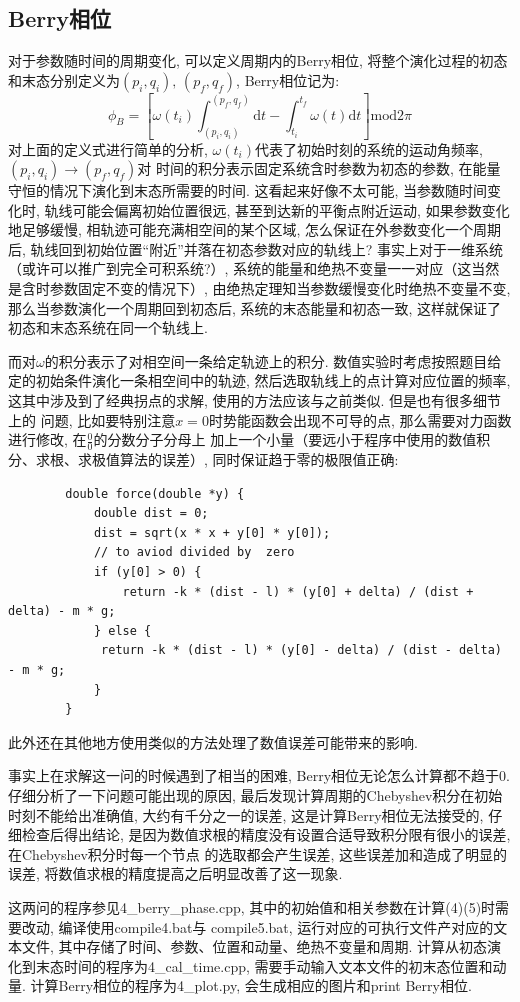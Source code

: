 \documentclass[a4paper,zihao=5,UTF8]{ctexart}
\def\d{\mathrm{d}}
\begin{document}
    \subsection{Berry相位}
    对于参数随时间的周期变化, 可以定义周期内的Berry相位, 将整个演化过程的初态和末态分别定义为$(p_i, q_i),\,(p_f,q_f)$,
    Berry相位记为:
    \begin{equation}
        \phi_B = \left[\omega(t_i)\int_{(p_i, q_i)}^{(p_f,q_f)}\d t - \int_{t_i}^{t_f}\omega(t)\d t\right] \text{mod}2\pi
    \end{equation}
    对上面的定义式进行简单的分析, $\omega(t_i)$代表了初始时刻的系统的运动角频率, $(p_i, q_i)\to(p_f, q_f)$对
    时间的积分表示固定系统含时参数为初态的参数, 在能量守恒的情况下演化到末态所需要的时间. 
    这看起来好像不太可能, 当参数随时间变化时, 轨线可能会偏离初始位置很远, 甚至到达新的平衡点附近运动,
    如果参数变化地足够缓慢, 相轨迹可能充满相空间的某个区域, 怎么保证在外参数变化一个周期后, 
    轨线回到初始位置“附近”并落在初态参数对应的轨线上? 事实上对于一维系统（或许可以推广到完全可积系统?）, 
    系统的能量和绝热不变量一一对应（这当然是含时参数固定不变的情况下）, 由绝热定理知当参数缓慢变化时绝热不变量不变, 
    那么当参数演化一个周期回到初态后, 系统的末态能量和初态一致, 这样就保证了初态和末态系统在同一个轨线上.
    \par
    而对$\omega$的积分表示了对相空间一条给定轨迹上的积分. 数值实验时考虑按照题目给定的初始条件演化一条相空间中的轨迹, 
    然后选取轨线上的点计算对应位置的频率, 这其中涉及到了经典拐点的求解, 使用的方法应该与之前类似. 但是也有很多细节上的
    问题, 比如要特别注意$x=0$时势能函数会出现不可导的点, 那么需要对力函数进行修改, 在$\frac{0}{0}$的分数分子分母上
    加上一个小量（要远小于程序中使用的数值积分、求根、求极值算法的误差）, 同时保证趋于零的极限值正确:
    \begin{lstlisting}
        double force(double *y) {
            double dist = 0;
            dist = sqrt(x * x + y[0] * y[0]);
            // to aviod divided by  zero
            if (y[0] > 0) {
                return -k * (dist - l) * (y[0] + delta) / (dist + delta) - m * g;
            } else {
             return -k * (dist - l) * (y[0] - delta) / (dist - delta) - m * g;
            }
        }
    \end{lstlisting}
    此外还在其他地方使用类似的方法处理了数值误差可能带来的影响. 
    \par 
    事实上在求解这一问的时候遇到了相当的困难, Berry相位无论怎么计算都不趋于0. 仔细分析了一下问题可能出现的原因, 
    最后发现计算周期的Chebyshev积分在初始时刻不能给出准确值, 大约有千分之一的误差, 这是计算Berry相位无法接受的, 
    仔细检查后得出结论, 是因为数值求根的精度没有设置合适导致积分限有很小的误差, 在Chebyshev积分时每一个节点
    的选取都会产生误差, 这些误差加和造成了明显的误差, 将数值求根的精度提高之后明显改善了这一现象. 
    \par
    这两问的程序参见4\_berry\_phase.cpp, 其中的初始值和相关参数在计算(4)(5)时需要改动, 编译使用compile4.bat与
    compile5.bat, 运行对应的可执行文件产对应的文本文件, 其中存储了时间、参数、位置和动量、绝热不变量和周期.
    计算从初态演化到末态时间的程序为4\_cal\_time.cpp, 需要手动输入文本文件的初末态位置和动量.
    计算Berry相位的程序为4\_plot.py, 会生成相应的图片和print Berry相位.
\end{document}
